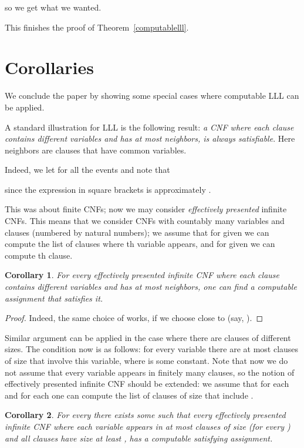 \documentclass[12pt]{article}
\newtheorem{corollary}{Corollary}
\begin{document}
so we get what we wanted.

\medskip
This finishes the proof of Theorem~\ref{computablelll}.

\section{Corollaries}

We conclude the paper by showing some special cases where computable LLL can be applied.

A standard illustration for LLL is the following result:
\emph{a CNF where each clause contains  different variables and
has at most  neighbors, is always satisfiable}.
Here neighbors are clauses that have common variables.

Indeed, we let  for all the events and note that
  
since the expression in square brackets is approximately .

This was about finite CNFs; now we may consider \emph{effectively presented} infinite CNFs. This means that we consider CNFs with countably many variables and clauses (numbered by natural numbers); we assume that for given  we
can compute the list of clauses where th variable appears, and for given
 we can compute th clause.

\begin{corollary}
For every effectively presented infinite CNF where each clause contains  different variables and has at most  neighbors, one can find a computable
    assignment that satisfies it.
\end{corollary}

\begin{proof}
Indeed, the same choice of  works, if we choose  close to  (say, ).
\end{proof}

Similar argument can be applied in the case where there are clauses
of different sizes. The condition now is as follows: for every variable there
are at most  clauses of size  that involve this variable,
where  is some constant. Note that now we do not assume
that every variable appears in finitely many clauses, so the notion of
effectively presented infinite CNF should be extended: we assume that for each
 and for each  one can compute the list of clauses of size  that
include .

\begin{corollary}\label{variable-cnf}
    For every  there exists some  such that every effectively presented infinite CNF where each variable appears in at most  clauses of size  \textup(for every \textup) and all clauses have size at least , has a computable satisfying assignment.
\end{corollary}
\end{document}
